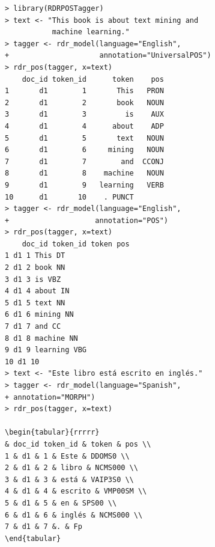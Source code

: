 \documentclass[11pt,openany,executivepaper]{book}
\begin{document}
\begin{verbatim}
> library(RDRPOSTagger)
> text <- "This book is about text mining and
           machine learning."
> tagger <- rdr_model(language="English",
+                     annotation="UniversalPOS")
> rdr_pos(tagger, x=text)
    doc_id token_id      token    pos
1       d1        1       This   PRON
2       d1        2       book   NOUN
3       d1        3         is    AUX
4       d1        4      about    ADP
5       d1        5       text   NOUN
6       d1        6     mining   NOUN
7       d1        7        and  CCONJ
8       d1        8    machine   NOUN
9       d1        9   learning   VERB
10      d1       10    . PUNCT  
> tagger <- rdr_model(language="English",
+                    annotation="POS")
> rdr_pos(tagger, x=text)
    doc_id token_id token pos
1 d1 1 This DT
2 d1 2 book NN
3 d1 3 is VBZ
4 d1 4 about IN
5 d1 5 text NN
6 d1 6 mining NN
7 d1 7 and CC
8 d1 8 machine NN
9 d1 9 learning VBG
10 d1 10
> text <- "Este libro está escrito en inglés."
> tagger <- rdr_model(language="Spanish",
+ annotation="MORPH")
> rdr_pos(tagger, x=text)

\begin{tabular}{rrrrr} 
& doc_id token_id & token & pos \\
1 & d1 & 1 & Este & DDOMS0 \\
2 & d1 & 2 & libro & NCMS000 \\
3 & d1 & 3 & está & VAIP3S0 \\
4 & d1 & 4 & escrito & VMP00SM \\
5 & d1 & 5 & en & SPS00 \\
6 & d1 & 6 & inglés & NCMS000 \\
7 & d1 & 7 &. & Fp
\end{tabular}
\end{verbatim}


\backmatter

\end{document}
